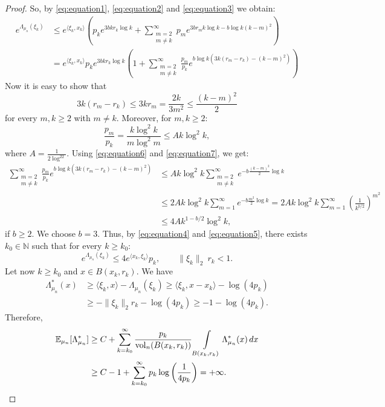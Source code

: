 \documentclass[11pt,a4paper]{article} %
\theoremstyle{definition}
\theoremstyle{remark}
\newcommand{\1}{\mathds{1}}
\newcommand{\vol}{{\rm{vol}}}
\begin{document}
\begin{proof}
So, by \eqref{eq:equation1}, \eqref{eq:equation2} and \eqref{eq:equation3} we obtain:
\begin{equation}\label{eq:equation4}
\begin{aligned}e^{\Lambda_{\mu_n}(\xi_k)} &\leq e^{ \langle \xi_k, x_k \rangle} \left( p_k e^{3bk r_k \log k} + \sum\limits_{\substack{m=2 \\ m \neq k}}^{\infty} p_m e^{3br_mk \log k -b \log k (k-m)^2} \right)
\\ 
&= e^{ \langle \xi_k, x_k \rangle} p_k e^{3bk r_k \log k} \left(1+ \sum\limits_{\substack{m=2 \\ m \neq k}}^{\infty} \frac{p_m}{p_k} e^{b \log k (3k(r_m-r_k)-(k-m)^2)}\right)
\end{aligned}
\end{equation}
Now it is easy to show that 
\begin{equation}\label{eq:equation6}
3k(r_m-r_k) \leq 3kr_m =\frac{2k}{3m^2} \leq \frac{(k-m)^2}{2}
\end{equation}
for every $m,k \geq 2$ with $m \neq k$. Moreover, for $m,k \geq 2$: \begin{equation}\label{eq:equation7}
\frac{p_m}{p_k} = \frac{k \log^2k}{m \log^2 m} \leq A k \log^2 k,
\end{equation}
where $A=\frac{1}{2 \log^22}$. Using \eqref{eq:equation6} and \eqref{eq:equation7}, we get:
\begin{equation}\label{eq:equation5}
\begin{aligned} \sum\limits_{\substack{m=2 \\ m \neq k}}^{\infty} \frac{p_m}{p_k} e^{b \log k (3k(r_m-r_k)-(k-m)^2)} &\leq A k \log^2 k \sum\limits_{\substack{m=2 \\ m \neq k}}^{\infty} e^{-b  \frac{(k-m)^2}{2} \log k} 
\\
&\leq 2Ak \log^2 k \sum\limits_{m=1}^{\infty} e^{-b  \frac{m^2}{2} \log k } = 2Ak \log^2 k \sum\limits_{m=1}^{\infty} \left( \frac{1}{k^{b/2}}\right)^{m^2} 
\\
&\leq 4A k^{1-b/2} \log^2 k ,
\end{aligned}
\end{equation}
if $b \geq 2$.  We choose $b=3$. Thus, by \eqref{eq:equation4} and \eqref{eq:equation5}, there exists $k_0 \in \mathbb{N}$ such that for every $k \geq k_0$: $$e^{\Lambda_{\mu_n}(\xi_k)} \leq 4e^{\langle x_k , \xi_k \rangle}p_k, \qquad \|\xi_k\|_2 \ r_k<1.$$
Let now  $k \geq k_0$ and $x \in B(x_k,r_k)$. We have
\begin{align*}
   \Lambda_{\mu_n}^{\ast}(x) &\geq \langle \xi_k,x \rangle - \Lambda_{\mu_n}(\xi_k) \geq \langle \xi_k,x-x_k\rangle -\log (4p_k)  \\
&\geq -\|\xi_k\|_2r_k-\log(4p_k) \geq -1-\log(4p_k).
\end{align*}
Therefore, \begin{align*}\mathbb{E}_{\mu_n}[\Lambda_{\mu_n}^{\ast}] & \geq C+\sum\limits_{k=k_0}^{\infty} \frac{p_k}{\vol_n(B(x_k,r_k))} \int\limits_{B(x_k,r_k)} \Lambda_{\mu_n}^{\ast}(x) \, dx
\\
&\geq C-1+\sum\limits_{k=k_0}^{\infty} p_k \log\left(\frac{1}{4p_k}\right)=+\infty.
\end{align*}
\end{proof}
\end{document}
